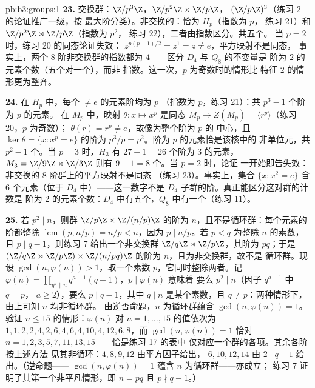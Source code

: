 \begin{solution}{pb:b3:groups:1}
\textbf{23.} 交换群：$\Z/p^3\Z$，$\Z/p^2\Z\times\Z/p\Z$，
$(\Z/p\Z)^3$（练习 2 的论证推广一级，按
最大阶分类）。非交换的：恰为 $H_p$（指数为 $p$，
练习 21）和 $\Z/p^2\Z\rtimes\Z/p\Z$（指数为 $p^2$，
练习 22），二者由指数区分。共五个。
当 $p = 2$ 时，练习 20 的同态论证失效：
$z^{p(p-1)/2} = z^{1} = z \neq e$，平方映射不是同态，
事实上，两个 $8$ 阶非交换群的指数都为
$4$——区分 $D_4$ 与 $Q_8$ 的不变量是
阶为 $2$ 的元素个数（五个对一个），而非
指数。这一次，$p$ 为奇数时的情形比
特征 $2$ 的情形更为整齐。

\textbf{24.} 在 $H_p$ 中，每个 $\neq e$ 的元素阶均为 $p$
（指数为 $p$，练习 21）：共 $p^3 - 1$ 个阶为 $p$ 的元素。
在 $M_p$ 中，映射 $\theta \colon x \mapsto x^p$ 是同态
$M_p \to Z(M_p) = \langle r^p\rangle$（练习 20，$p$ 为奇数）；
$\theta(r) = r^p \neq e$，故像为整个阶为 $p$ 的
中心，且 $\ker\theta = \{x : x^p = e\}$ 的阶为 $p^3/p =
p^2$。阶为 $p$ 的元素恰是该核中的
非单位元，共 $p^2 - 1$ 个。当 $p = 3$ 时，$H_3$ 有
$27 - 1 = 26$ 个阶为 $3$ 的元素，$M_3 = \Z/9\Z \rtimes
\Z/3\Z$ 则有 $9 - 1 = 8$ 个。当 $p = 2$ 时，论证
一开始即告失效：非交换的 $8$ 阶群上的平方映射不是同态
（练习 23）。事实上，集合 $\{x : x^2 = e\}$
含 $6$ 个元素（位于 $D_4$ 中）——这一数字不是
$D_4$ 子群的阶。真正能区分这对群的计数是
阶为 $2$ 的元素个数：$D_4$ 中有五个，$Q_8$ 中有一个（练习
11）。

\textbf{25.} 若 $p^2 \mid n$，则群 $\Z/p\Z \times
\Z/(n/p)\Z$ 的阶为 $n$，且不是循环群：每个元素的
阶都整除 $\operatorname{lcm}(p, n/p) = n/p < n$，因为
$p \mid n/p$。若 $p < q$ 为整除 $n$ 的素数，且 $p \mid
q - 1$，则练习 7 给出一个非交换群 $\Z/q\Z \rtimes
\Z/p\Z$，其阶为 $pq$；于是 $(\Z/q\Z \rtimes \Z/p\Z) \times
\Z/(n/pq)\Z$ 的阶为 $n$，且为非交换群，故不是
循环群。现设 $\gcd(n, \varphi(n)) > 1$，取一个素数
$p$，它同时整除两者。记 $\varphi(n) = \prod_{q^a \parallel
n} q^{a-1}(q - 1)$，$p \mid \varphi(n)$ 意味着
要么 $p^2 \mid n$（因子 $q^{a-1}$ 中 $q = p$，
$a \geq 2$），要么 $p \mid q - 1$，其中 $q \mid n$ 是某个素数，且 $q
\neq p$：两种情形下，由上可知 $n$ 均非循环群。
由逆否命题，$n$ 为循环群蕴含 $\gcd(n, \varphi(n)) = 1$。
验证 $n \leq 15$ 的情形：$\varphi(n)$ 对 $n = 1,
\dots, 15$ 的值依次为 $1, 1, 2, 2, 4, 2, 6, 4, 6, 4, 10, 4, 12, 6,
8$，而 $\gcd(n, \varphi(n)) = 1$ 恰对 $n = 1, 2, 3, 5,
7, 11, 13, 15$——恰是练习 17 的表中
仅对应一个群的各项。其余各阶按上述方法
见其非循环：$4, 8, 9, 12$ 由平方因子给出，
$6, 10, 12, 14$ 由 $2 \mid q - 1$ 给出。（逆命题——
$\gcd(n, \varphi(n)) = 1$ 蕴含 $n$ 为循环群——亦成立；
练习 7 证明了其第一个非平凡情形，即 $n = pq$ 且
$p \nmid q - 1$。）
\end{solution}
